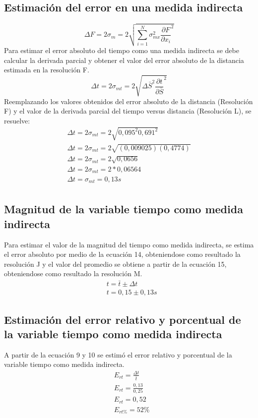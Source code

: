 \documentclass[runningheads]{llncs}
\begin{document}
    \subsection{Estimación del error en una medida indirecta}
    \begin{equation}
        \Delta F=2\sigma_{m}=2{\sqrt{{\displaystyle\sum_{i=1}^{N}\sigma_{mx}^{2} \frac{\partial F}{\partial x_{i}}^{2}}}}
    \end{equation}
    Para estimar el error absoluto del tiempo como una medida indirecta se debe calcular la derivada parcial y obtener el valor del error absoluto de la distancia estimada en la resolución F.
    \begin{equation}
        \Delta t=2\sigma_{mt}=2{\sqrt{\Delta \bar{S}^{2} \frac{\partial t}{\partial \bar{S}}^{2}}}
    \end{equation}
    Reemplazando los valores obtenidos del error absoluto de la distancia (Resolución F) y el valor de la derivada parcial del tiempo versus distancia (Resolución L), se resuelve:
    \begin{align*}
        \Delta t=2\sigma_{mt}=2{\sqrt{0,095^{2} 0,691^{2}}}\\
        \Delta t=2\sigma_{mt}=2{\sqrt{(0,009025) (0,4774)}}\\
        \Delta t=2\sigma_{mt}=2{\sqrt{0,0656}}\\
        \Delta t=2\sigma_{mt}=2*0,06564\\
        \Delta t=\sigma_{mt}=0,13s\tag{J}\\
    \end{align*}
    \subsection{Magnitud de la variable tiempo como medida indirecta}
    Para estimar el valor de la magnitud del tiempo como medida indirecta, se estima el error absoluto por medio de la ecuación 14, obteniendose como resultado la resolución J y el valor del promedio se obtiene a partir de la
    ecuación 15, obteniendose como resultado la resolución M.
    \begin{align*}
        &t=\bar{t}\pm \Delta t\\
        &t=0,15 \pm0,13 s
    \end{align*} 
    \subsection{Estimación del error relativo y porcentual de la variable tiempo como medida indirecta}
    A partir de la ecuación 9 y 10 se estimó el error relativo y porcentual de la variable tiempo como medida indirecta. 
    \begin{align*}
        &E_{rt}=\frac{\Delta t}{\bar{t}}\\
        &E_{rt}=\frac{0,13}{0,25}\\
        &E_{rt}=0,52 \tag{K}\\
        &E_{rt\%}=52\% \tag{L}
    \end{align*}
\end{document}
